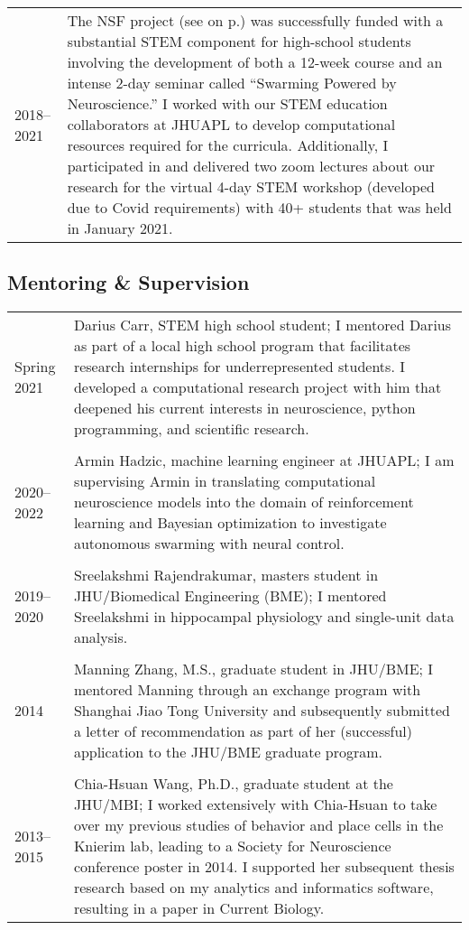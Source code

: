 \documentclass[10pt]{article}
\begin{document}
\begin{tabular}{@{\hspace{0.2in}}l>{\raggedright\arraybackslash}p{}}
  2018--2021 \hspace{0.1in} & The NSF project (see
  \emph{\nameref{sec:funding}} on p.\pageref{sec:funding}) was
  successfully funded with a substantial STEM component for high-school students
  involving the development of both a 12-week course and an intense 2-day
  seminar called ``Swarming Powered by Neuroscience.'' I worked with our STEM
  education collaborators at JHUAPL to develop computational resources required
  for the curricula. Additionally, I participated in and delivered two zoom
  lectures about our research for the virtual 4-day STEM workshop (developed due
  to Covid requirements) with 40+ students that was held in January 2021.
\end{tabular}

\subsection*{Mentoring \& Supervision}
\label{sec:mentoring}

\begin{tabular}{@{\hspace{0.2in}}l>{\raggedright\arraybackslash}p{}}
  Spring 2021 & Darius Carr, STEM high school student; I mentored
  Darius as part of a local high school program that facilitates research
  internships for underrepresented students. I developed a computational
  research project with him that deepened his current interests in neuroscience,
  python programming, and scientific research. \\
  \tabularnewline
  2020--2022 \hspace{0.1in} & Armin Hadzic, machine learning engineer at JHUAPL; I
  am supervising Armin in translating computational neuroscience models into
  the domain of reinforcement learning and Bayesian optimization to investigate
  autonomous swarming with neural control. \\
  \tabularnewline
  2019--2020 & Sreelakshmi Rajendrakumar, masters student in
  JHU/Biomedical Engineering (BME); I mentored Sreelakshmi in hippocampal
  physiology and single-unit data analysis.\\
  \tabularnewline
  2014 & Manning Zhang, M.S., graduate student in JHU/BME; I mentored Manning
  through an exchange program with Shanghai Jiao Tong University and
  subsequently submitted a letter of recommendation as part of her (successful)
  application to the JHU/BME graduate program.\\
  \tabularnewline
  2013--2015 & Chia-Hsuan Wang, Ph.D., graduate student at the JHU/MBI; I worked
  extensively with Chia-Hsuan to take over my previous studies of behavior
  and place cells in the Knierim lab, leading to a Society for Neuroscience
  conference poster in 2014. I supported her subsequent thesis research based
  on my analytics and informatics software, resulting in a paper in Current
  Biology.\\
\end{tabular}
\end{document}
